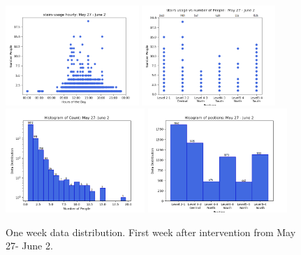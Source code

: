 \begin{figure}[!h]
    \centering
      \includegraphics[width=0.45\textwidth]{image/Chapters/Chapter6/oneWeekAfterhourly.png}%
    \includegraphics[width=0.45\textwidth]{image/Chapters/Chapter6/PositionCountOneWeekAfter.png}\hfill
    \includegraphics[width=0.47\textwidth]{image/Chapters/Chapter6/oneweekCountDistributonAfter.png}%
    \includegraphics[width=0.47\textwidth]{image/Chapters/Chapter6/oneweekafterPositionDistributon.png}
    \caption{One week data distribution. First week after intervention from May 27- June 2.}
    \label{1dayact}
\end{figure}

